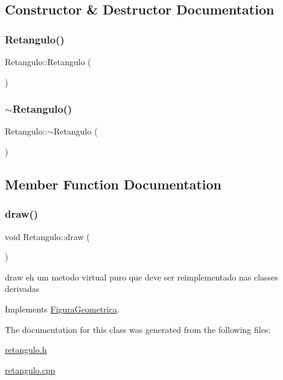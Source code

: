 \subsection{Constructor \& Destructor Documentation}
\mbox{\label{class_retangulo_ac21a81cae046920c8bee401bcb879562}} 
\subsubsection{\texorpdfstring{Retangulo()}{Retangulo()}}
{\footnotesize\ttfamily Retangulo\+::\+Retangulo (\begin{DoxyParamCaption}{ }\end{DoxyParamCaption})}

\mbox{\label{class_retangulo_a52b1a7f23e13a531a30526825b164615}} 
\subsubsection{\texorpdfstring{$\sim$\+Retangulo()}{~Retangulo()}}
{\footnotesize\ttfamily Retangulo\+::$\sim$\+Retangulo (\begin{DoxyParamCaption}{ }\end{DoxyParamCaption})}



\subsection{Member Function Documentation}
\mbox{\label{class_retangulo_a48cb75fe7cd048727879c25485976444}} 
\subsubsection{\texorpdfstring{draw()}{draw()}}
{\footnotesize\ttfamily void Retangulo\+::draw (\begin{DoxyParamCaption}{ }\end{DoxyParamCaption})\hspace{0.3cm}{\ttfamily [virtual]}}



draw eh um metodo virtual puro que deve ser reimplementado nas classes derivadas 



Implements \hyperlink{class_figura_geometrica_a727cea2befcb22b2457c088127fe041d}{Figura\+Geometrica}.



The documentation for this class was generated from the following files\+:\begin{DoxyCompactItemize}
\item 
\hyperlink{retangulo_8h}{retangulo.\+h}\item 
\hyperlink{retangulo_8cpp}{retangulo.\+cpp}\end{DoxyCompactItemize}
